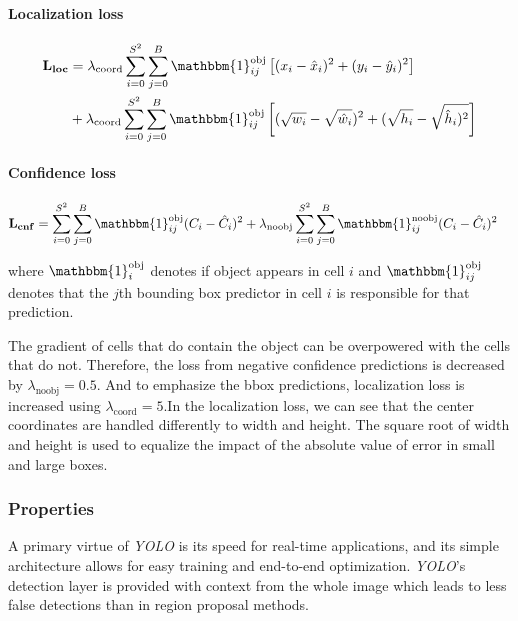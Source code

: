 \paragraph{Localization loss}
\begin{align*}
\mathbf{L_{loc}} &= \lambda_{\text{coord}} \sum_{i=0}^{S^2} \sum_{j=0}^B \mathbbm{1}_{ij}^{\text{obj}} \left[(x_i - \hat{x}_i)^2 + (y_i - \hat{y}_i)^2\right] \\
 &+  \lambda_{\text{coord}} \sum_{i=0}^{S^2} \sum_{j=0}^B \mathbbm{1}_{ij}^{\text{obj}} \left[(\sqrt{w_i} - \sqrt{\hat{w}_i})^2 + (\sqrt{h_i} - \sqrt{\hat{h}_i)^2}\right]
\end{align*}

\paragraph{Confidence loss}
\begin{align*}
\mathbf{L_{cnf}} &= \sum_{i=0}^{S^2} \sum_{j=0}^B \mathbbm{1}_{ij}^{\text{obj}} (C_i - \hat{C}_i)^2 
+ \lambda_{\text{noobj}} \sum_{i=0}^{S^2} \sum_{j=0}^B \mathbbm{1}_{ij}^{\text{noobj}} (C_i - \hat{C}_i)^2
\end{align*}

\noindent where $\mathbbm{1}^{\text{obj}}_i$ denotes if object appears in cell $i$ and $\mathbbm{1}^{\text{obj}}_{ij}$ denotes that the $j$th bounding box predictor in cell $i$ is responsible for that prediction.

The gradient of cells that do contain the object can be overpowered with the cells that do not.  Therefore, the loss from negative confidence predictions is decreased by $\lambda_{\text{noobj}} = 0.5$. And to emphasize the bbox predictions, localization loss is increased using $\lambda_{\text{coord}} = 5$.In the localization loss, we can see that the center coordinates are handled differently to width and height. The square root of width and height is used to equalize the impact of the absolute value of error in small and large boxes.


\subsubsection{Properties}
A primary virtue of \textit{YOLO} is its speed for real-time applications, and its simple architecture allows for easy training and end-to-end optimization. \textit{YOLO}'s detection layer is provided with context from the whole image which leads to less false detections than in region proposal methods. 

